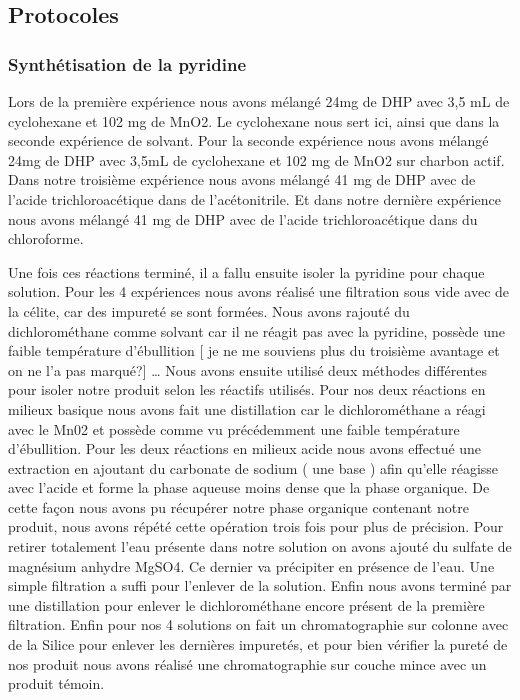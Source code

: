 \documentclass{article}
\begin{document}
\subsection{Protocoles}

\subsubsection{Synthétisation de la pyridine}

Lors de la première expérience nous avons mélangé 24mg de DHP avec 3,5 mL de cyclohexane et 102 mg de MnO2. Le cyclohexane nous sert ici, ainsi que dans la seconde expérience de solvant.
Pour la seconde expérience nous avons mélangé 24mg de DHP avec 3,5mL de cyclohexane et 102 mg de MnO2 sur charbon actif.
Dans notre troisième expérience nous avons mélangé 41 mg de DHP avec de l’acide trichloroacétique dans de l’acétonitrile.
Et dans notre dernière expérience nous avons mélangé 41 mg de DHP avec de l’acide trichloroacétique dans du chloroforme.
\medbreak

Une fois ces réactions terminé, il a fallu ensuite isoler la pyridine pour chaque solution.
\medbreak
Pour les 4 expériences nous avons réalisé une filtration sous vide avec de la célite, car  des impureté se sont formées. Nous avons rajouté du dichlorométhane comme solvant car il ne  réagit pas avec la pyridine, possède une faible température d’ébullition [ je ne me souviens plus du troisième avantage et on ne l’a pas marqué?] …
\medbreak
Nous avons ensuite utilisé deux méthodes différentes pour isoler notre produit selon les réactifs utilisés.
Pour nos deux réactions en milieux basique nous avons fait une distillation car le dichlorométhane a réagi avec le Mn02 et possède comme vu précédemment une faible température d’ébullition.
Pour les deux réactions en milieux acide nous avons effectué une extraction en ajoutant du carbonate de sodium ( une base ) afin qu’elle réagisse avec l’acide et forme la phase aqueuse  moins dense que la phase organique. De cette façon nous avons pu récupérer notre phase organique contenant notre produit, nous avons répété cette opération trois fois pour plus de précision. Pour retirer totalement l’eau présente dans notre solution on avons ajouté du sulfate de magnésium anhydre MgSO4. Ce dernier va précipiter en présence de l’eau. Une simple filtration a suffi pour l’enlever de la solution.  Enfin nous avons terminé par une distillation pour enlever le dichlorométhane encore présent de la première filtration.
Enfin pour nos 4 solutions on fait un chromatographie sur colonne avec de la Silice pour enlever les dernières impuretés, et  pour bien vérifier la pureté de nos produit nous avons réalisé une chromatographie sur couche mince avec un produit témoin.
\end{document}
